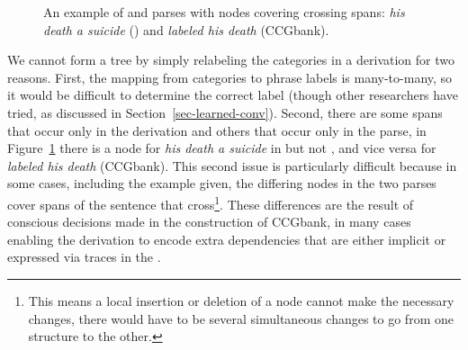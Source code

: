 \begin{figure}

\caption[An example of \ccg and \ptb parses with nodes covering crossing spans.]{ \label{fig:ccg-example}
  An example of \ccg and \ptb parses with nodes covering crossing spans: \emph{his death a suicide} (\ptb) and \emph{labeled his death} (CCGbank).
}
\end{figure}

We cannot form a \ptb tree by simply relabeling the categories in a \ccg derivation for two reasons.
First, the mapping from categories to phrase labels is many-to-many, so it would be difficult to determine the correct label (though other researchers have tried, as discussed in Section~\ref{sec-learned-conv}).
Second, there are some spans that occur only in the \ccg derivation and others that occur only in the \ptb parse, \myeg in Figure~\ref{fig:ccg-example} there is a node for \emph{his death a suicide} in \ptb but not \ccg, and vice versa for \emph{labeled his death} (CCGbank).
This second issue is particularly difficult because in some cases, including the example given, the differing nodes in the two parses cover spans of the sentence that cross\footnote{This means a local insertion or deletion of a node cannot make the necessary changes, there would have to be several simultaneous changes to go from one structure to the other.}.
These differences are the result of conscious decisions made in the construction of CCGbank, in many cases enabling the derivation to encode extra dependencies that are either implicit or expressed via traces in the \ptb.

